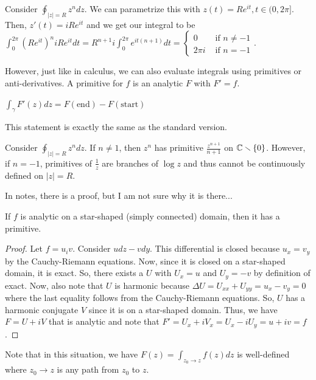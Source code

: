 \documentclass[11pt,leqno,oneside]{amsart}
\begin{document}
  \begin{example}
    Consider $\oint_{|z|=R} z^n dz$. We can parametrize this with
    $z(t) = Re^{it}, t \in (0,2\pi]$. Then, $z'(t) = iRe^{it}$ and we
    get our integral to be $\int_0^{2\pi} (Re^{it})^n iRe^{it} dt =
    R^{n+1} i \int_0^{2\pi} e^{it(n+1)} dt =
    \begin{cases}
      0 & \text{ if } n \neq -1 \\
      2 \pi i & \text{ if } n=-1
    \end{cases}.$
  \end{example}
  However, just like in calculus, we can also evaluate integrals using
  primitives or anti-derivatives. A primitive for $f$ is an analytic
  $F$ with $F'=f$.
  \begin{thm}
    $\int_\gamma F'(z)dz = F(\text{end}) - F(\text{start})$
  \end{thm}
  This statement is exactly the same as the standard version.
  \begin{example}
    Consider $\oint_{|z|=R} z^n dz$. If $n \neq 1$, then $z^n$ has
    primitive $\frac{z^{n+1}}{n+1}$ on ${\mathbb C} \smallsetminus
    \{0\}$. However, if $n=-1$, primitives of $\frac{1}{z}$ are
    branches of $\log z$ and thus cannot be continuously defined on
    $|z|=R$.
  \end{example}
  In notes, there is a proof, but I am not sure why it is there...
  \begin{thm}
    If $f$ is analytic on a star-shaped (simply connected) domain,
    then it has a primitive.
  \end{thm}
  \begin{proof}
    Let $f=u_iv$. Consider $udz-vdy$. This differential is closed
    because $u_x = v_y$ by the Cauchy-Riemann equations. Now, since it
    is closed on a star-shaped domain, it is exact. So, there exists a
    $U$ with $U_x = u$ and $U_y = -v$ by definition of exact. Now,
    also note that $U$ is harmonic because $\Delta U = U_{xx} + U_{yy}
    = u_x-v_y = 0$ where the last equality follows from the
    Cauchy-Riemann equations. So, $U$ has a harmonic conjugate $V$
    since it is on a star-shaped domain. Thus, we have $F = U+iV$ that
    is analytic and note that $F' = U_x + iV_x = U_x-iU_y = u+iv = f$.
  \end{proof}
  Note that in this situation, we have $F(z) = \int_{z_0 \to z}
  f(z)dz$ is well-defined where $z_0 \to z$ is any path from $z_0$ to
  $z$.
\end{document}
